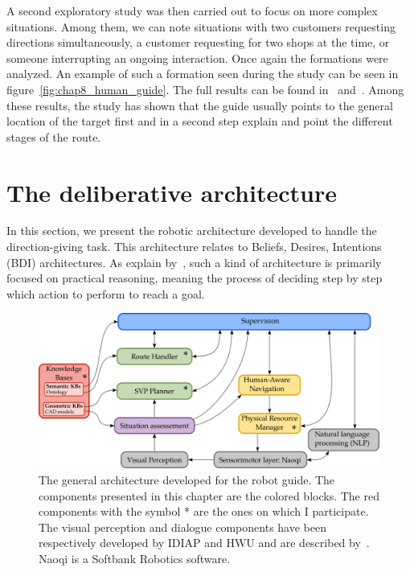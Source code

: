 A second exploratory study was then carried out to focus on more complex situations. Among them, we can note situations with two customers requesting directions simultaneously, a customer requesting for two shops at the time, or someone interrupting an ongoing interaction. Once again the formations were analyzed. An example of such a formation seen during the study can be seen in figure~\ref{fig:chap8_human_guide}. The full results can be found in~\cite{Heikkilae_2018_where} and~\cite{heikkilae_2019_should}. Among these results, the study has shown that the guide usually points to the general location of the target first and in a second step explain and point the different stages of the route.

\section{The deliberative architecture}

In this section, we present the robotic architecture developed to handle the direction-giving task. This architecture relates to Beliefs, Desires, Intentions (BDI) architectures. As explain by~\cite{wooldridge_1999_intelligent}, such a kind of architecture is primarily focused on practical reasoning, meaning the process of deciding step by step which action to perform to reach a goal. 

\begin{figure}[ht!]
\centering
\includegraphics[width=\textwidth]{figures/chapter8/architecture.png}
\caption{\label{fig:chap8_architecture} The general architecture developed for the robot guide. The components presented in this chapter are the colored blocks. The red components with the symbol * are the ones on which I participate. The visual perception and dialogue components have been respectively developed by IDIAP and HWU and are described by~\cite{foster_2019_mummer}. Naoqi is a Softbank Robotics software. }
\end{figure}

